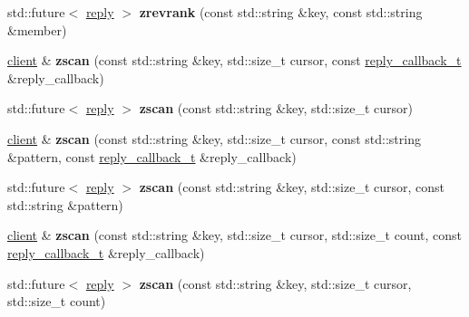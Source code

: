 \begin{DoxyCompactItemize}
std\+::future$<$ \hyperlink{classcpp__redis_1_1reply}{reply} $>$ {\bfseries zrevrank} (const std\+::string \&key, const std\+::string \&member)
\item 
\mbox{\label{classcpp__redis_1_1client_a2f62f5c0522752d22365e3a8cc0872aa}} 
\hyperlink{classcpp__redis_1_1client}{client} \& {\bfseries zscan} (const std\+::string \&key, std\+::size\+\_\+t cursor, const \hyperlink{classcpp__redis_1_1client_a061a1140d36d2eaeda82b09a0bb3f9f2}{reply\+\_\+callback\+\_\+t} \&reply\+\_\+callback)
\item 
\mbox{\label{classcpp__redis_1_1client_a68320f3e1279960c0eb4b68154738ca1}} 
std\+::future$<$ \hyperlink{classcpp__redis_1_1reply}{reply} $>$ {\bfseries zscan} (const std\+::string \&key, std\+::size\+\_\+t cursor)
\item 
\mbox{\label{classcpp__redis_1_1client_a06a2ef38d19e19af5e6f57dce543ecc4}} 
\hyperlink{classcpp__redis_1_1client}{client} \& {\bfseries zscan} (const std\+::string \&key, std\+::size\+\_\+t cursor, const std\+::string \&pattern, const \hyperlink{classcpp__redis_1_1client_a061a1140d36d2eaeda82b09a0bb3f9f2}{reply\+\_\+callback\+\_\+t} \&reply\+\_\+callback)
\item 
\mbox{\label{classcpp__redis_1_1client_afca988f95912f1f72f1d6d444c14c427}} 
std\+::future$<$ \hyperlink{classcpp__redis_1_1reply}{reply} $>$ {\bfseries zscan} (const std\+::string \&key, std\+::size\+\_\+t cursor, const std\+::string \&pattern)
\item 
\mbox{\label{classcpp__redis_1_1client_a4044c08822501d939b1b2a95b2431dd0}} 
\hyperlink{classcpp__redis_1_1client}{client} \& {\bfseries zscan} (const std\+::string \&key, std\+::size\+\_\+t cursor, std\+::size\+\_\+t count, const \hyperlink{classcpp__redis_1_1client_a061a1140d36d2eaeda82b09a0bb3f9f2}{reply\+\_\+callback\+\_\+t} \&reply\+\_\+callback)
\item 
\mbox{\label{classcpp__redis_1_1client_acfa7881d57ccdf7a0fff34eaf43feb56}} 
std\+::future$<$ \hyperlink{classcpp__redis_1_1reply}{reply} $>$ {\bfseries zscan} (const std\+::string \&key, std\+::size\+\_\+t cursor, std\+::size\+\_\+t count)

\end{DoxyCompactItemize}
